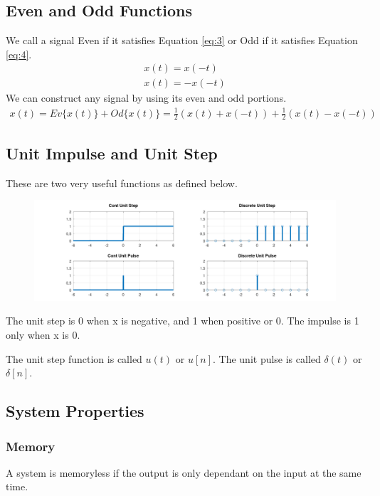 \documentclass[12pt,letterpaper]{article} \usepackage{amsmath} \usepackage{graphicx} \usepackage[margin=1in]{geometry} \usepackage{longtable}  \usepackage{amssymb}
\begin{document}
	\subsection{Even and Odd Functions}
	We call a signal Even if it satisfies Equation \ref{eq:3} or Odd if it satisfies Equation \ref{eq:4}.
	\begin{align}
		x(t) = x(-t) \label{eq:3}\\
		x(t) = -x(-t) \label{eq:4}
	\end{align}
	We can construct any signal by using its even and odd portions. 
	\begin{align}
		x(t) = Ev\{x(t)\} + Od\{x(t)\} = \frac{1}{2}(x(t) + x(-t)) + \frac{1}{2} (x(t) - x(-t)) \label{eq:5}
	\end{align}
	
	\subsection{Unit Impulse and Unit Step}
	These are two very useful functions as defined below.
	\begin{figure}[!h]
		\centering
		\includegraphics[width=0.9\linewidth]{images/unit step and impulse}
		
		\label{fig:unit}
	\end{figure}
	The unit step is 0 when x is negative, and 1 when positive or 0. The impulse is 1 only when x is 0.
	
	The unit step function is called $u(t)$ or $u[n]$. The unit pulse is called $\delta(t)$ or $\delta[n]$.
	
	\subsection{System Properties}
	
	\subsubsection{Memory}
	A system is memoryless if the output is only dependant on the input at the same time. 
	
\end{document}
